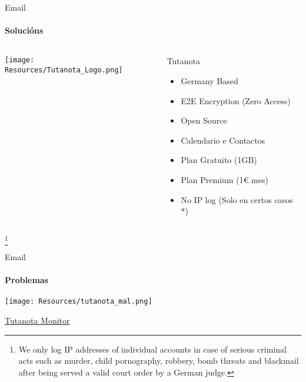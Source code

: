 \documentclass{beamer}
\begin{document}
\begin{frame}{Email}
  \framesubtitle{Solucións}

  \begin{columns}
    \begin{column}{0.5\textwidth}
      \texttt{[image: Resources/Tutanota\_Logo.png]}

      \vspace{1cm}


    \end{column}

    \begin{column}{0.4\textwidth}
      \begin{block}{Tutanota}
        \begin{itemize}
          \item Germany Based
          \item E2E Encryption (Zero Access)
          \item Open Source
          \item Calendario e Contactos
          \item Plan Gratuito (1GB)
          \item Plan Premium (1€ mes)
          \item No IP log (Solo en certos casos *)
        \end{itemize}
      \end{block}

    \end{column}

  \end{columns}

  \footnote{We only log IP addresses of individual accounts in case of serious criminal acts such as murder, child pornography, robbery, bomb threats and blackmail after being served a valid court order by a German judge.}

\end{frame}


\begin{frame}{Email}
  \framesubtitle{Problemas}

  \texttt{[image: Resources/tutanota\_mal.png]}

  \href{https://www.cyberscoop.com/court-rules-encrypted-email-tutanota-monitor-messages/}{Tutanota Monitor}

\end{frame}
\end{document}
